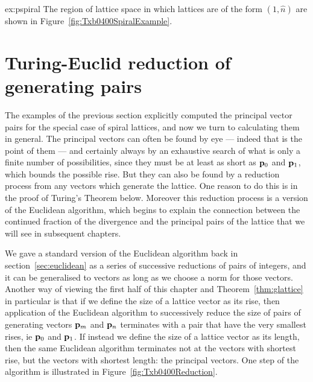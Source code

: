 \begin{jAnswer}{ex:pspiral}
The region of lattice space in which lattices are of the form $(1,\hat{n})$ are shown in Figure~\ref{fig:Txb0400SpiralExample}.

\end{jAnswer}
 
\clearpage
\section{Turing-Euclid reduction of generating pairs}
\label{sec:TEreduction}
The examples of the previous section explicitly computed the principal vector pairs for the special case of spiral lattices, and now we turn to calculating them in 
general. 
The principal vectors can often be found by eye --- indeed that is the point of them --- and certainly always by an exhaustive search of what is only a finite number of possibilities, since they must be at least as short as ${\mathbf p}_{0}$ and ${\mathbf p}_{1}$, which bounds the possible rise.
But they can also be found by a reduction process from any vectors which generate the lattice. One reason to do this is in the proof of Turing's Theorem below. Moreover this reduction process is a version of the Euclidean algorithm, which begins to explain the connection between the continued fraction of the divergence and the principal pairs of the lattice that we will see in subsequent chapters. 

We gave a standard version of the Euclidean algorithm back in section~\eqref{sec:euclidean} as a series of successive reductions of pairs of integers, and it can be generalised to vectors as long as we choose a norm for those vectors. Another way of viewing the first half of this chapter and Theorem~\ref{thm:glattice} in particular is that 
if we define the size of a lattice vector as its rise, then application of the Euclidean algorithm to successively reduce the size of pairs of generating  vectors ${\mathbf p}_{m}$ and ${\mathbf p}_{n}$  terminates with a pair that have the very smallest rises, ie ${\mathbf p}_{0}$ and ${\mathbf p}_{1}$. If instead we define the size of a lattice vector as its length, then the same Euclidean algorithm terminates not at the vectors with shortest rise, but the vectors with shortest length: the principal vectors. One step of the algorithm is illustrated in Figure~\ref{fig:Txb0400Reduction}.


